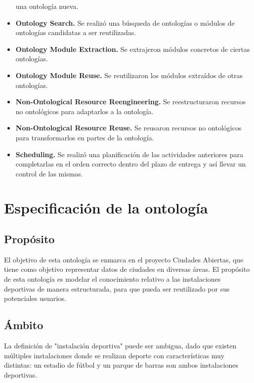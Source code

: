 \documentclass[a4paper,12pt]{article}
\begin{document}
\begin{itemize}
una ontología nueva.
		\item \textbf{Ontology Search.} Se realizó una búsqueda de ontologías o módulos de ontologías
candidatas a ser reutilizadas.
		\item \textbf{Ontology Module Extraction.} Se extrajeron módulos concretos de ciertas ontologías.
		\item \textbf{Ontology Module Reuse.} Se reutilizaron los módulos extraídos de otras ontologías.
		\item \textbf{Non-Ontological Resource Reengineering.} Se reestructuraron recursos no
ontológicos para adaptarlos a la ontología.
		\item \textbf{Non-Ontological Resource Reuse.} Se reusaron recursos no ontológicos para
transformarlos en partes de la ontología.
		\item \textbf{Scheduling.} Se realizó una planificación de las actividades anteriores para
completarlas en el orden correcto dentro del plazo de entrega y así llevar un control de las mismas.
	\end{itemize}
	
	\section{Especificación de la ontología}
	
	\subsection{Propósito}
	El objetivo de esta ontología se enmarca en el proyecto Ciudades Abiertas, que tiene como objetivo representar datos de ciudades en diversas áreas. El propósito de esta ontología es modelar el conocimiento relativo a las instalaciones deportivas de manera estructurada, para que pueda ser reutilizado por sus potenciales usuarios.
	
	\subsection{Ámbito}
	La definición de "instalación deportiva" puede ser ambigua, dado que existen múltiples instalaciones donde se realizan deporte con características muy distintas: un estadio de fútbol y un parque de barras son ambos instalaciones deportivas.
	
\end{document}
